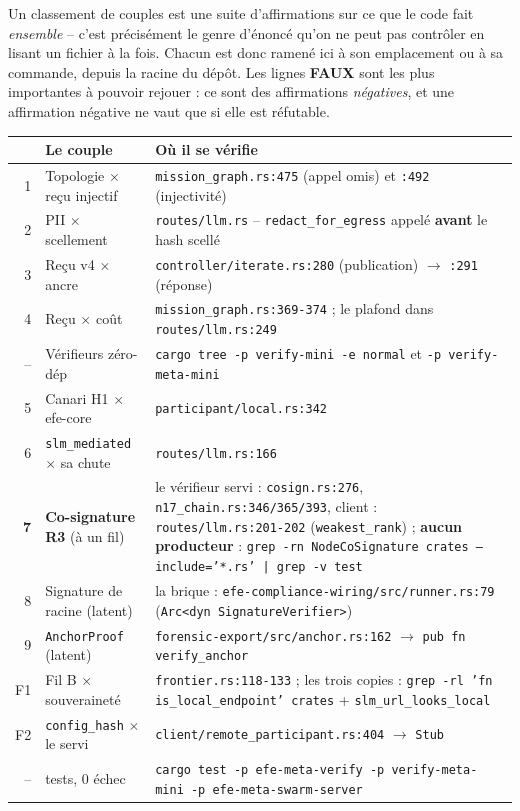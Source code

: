 \documentclass[10pt]{article}
\newcommand{\faux}{{\color{red}\textbf{FAUX}}}
\newcommand{\sz}[1]{{\small\color{grey}\textsf{#1}}}
\newcommand{\code}[1]{\texttt{\small #1}}
\newcommand{\x}{$\times$}
\begin{document}
Un classement de couples est une suite d'affirmations sur ce que le code fait \emph{ensemble} -- c'est
précisément le genre d'énoncé qu'on ne peut pas contrôler en lisant un fichier à la fois. Chacun est
donc ramené ici à son emplacement ou à sa commande, depuis la racine du dépôt. Les lignes \faux{} sont
les plus importantes à pouvoir rejouer : ce sont des affirmations \emph{négatives}, et une affirmation
négative ne vaut que si elle est réfutable.

\renewcommand{\arraystretch}{1.2}
\begin{center}\small
\begin{tabular}{@{}r >{\raggedright\arraybackslash}p{4.35cm} >{\raggedright\arraybackslash}p{11.0cm}@{}}
\toprule
& \textbf{Le couple} & \textbf{Où il se vérifie} \\
\midrule
1 & Topologie \x{} reçu injectif &
  \code{mission\_graph.rs:475} \sz{(appel omis)} et \code{:492} \sz{(injectivité)} \\
2 & PII \x{} scellement &
  \code{routes/llm.rs} -- \code{redact\_for\_egress} appelé \textbf{avant} le hash scellé \\
3 & Reçu v4 \x{} ancre &
  \code{controller/iterate.rs:280} \sz{(publication)} $\rightarrow$ \code{:291} \sz{(réponse)} \\
4 & Reçu \x{} coût &
  \code{mission\_graph.rs:369-374} ; le plafond dans \code{routes/llm.rs:249} \\
-- & Vérifieurs zéro-dép &
  \code{cargo tree -p verify-mini -e normal} \sz{et} \code{-p verify-meta-mini} \\
5 & Canari H1 \x{} efe-core &
  \code{participant/local.rs:342} \\
6 & \code{slm\_mediated} \x{} sa chute &
  \code{routes/llm.rs:166} \\
\textbf{7} & \textbf{Co-signature R3} \sz{(à un fil)} &
  le vérifieur servi : \code{cosign.rs:276}, \code{n17\_chain.rs:346/365/393},
  \newline client : \code{routes/llm.rs:201-202} \sz{(\code{weakest\_rank})} ;
  \newline \textbf{aucun producteur} :
  \code{grep -rn NodeCoSignature crates --include='*.rs' | grep -v test} \\
8 & Signature de racine \sz{(latent)} &
  la brique : \code{efe-compliance-wiring/src/runner.rs:79} \sz{(\code{Arc<dyn SignatureVerifier>})} \\
9 & \code{AnchorProof} \sz{(latent)} &
  \code{forensic-export/src/anchor.rs:162} $\rightarrow$ \code{pub fn verify\_anchor} \\
F1 & Fil B \x{} souveraineté &
  \code{frontier.rs:118-133} ; les trois copies :
  \code{grep -rl 'fn is\_local\_endpoint' crates} + \code{slm\_url\_looks\_local} \\
F2 & \code{config\_hash} \x{} le servi &
  \code{client/remote\_participant.rs:404} $\rightarrow$ \code{Stub} \\
-- & 515 tests, 0 échec &
  \code{cargo test -p efe-meta-verify -p verify-meta-mini -p efe-meta-swarm-server} \\
\bottomrule
\end{tabular}
\end{center}
\end{document}
